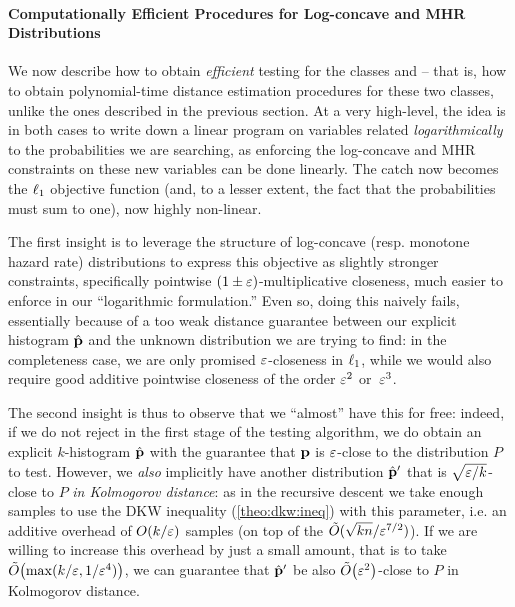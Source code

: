 \paragraph{Computationally Efficient Procedures for Log-concave and MHR Distributions}\label{ssec:efficient:logconcave:mhr}

We now describe how to obtain \emph{efficient} testing for the classes \classlogconcave and \classmhr{} -- that is, how to obtain polynomial-time distance estimation procedures for these two classes, unlike the ones described in the previous section. At a very high-level, the idea is in both cases to write down a linear program on variables related \emph{logarithmically} to the probabilities we are searching, as enforcing the log-concave and MHR constraints on these new variables can be done linearly. The catch now becomes the $\lp[1]$ objective function (and, to a lesser extent, the fact that the probabilities must sum to one), now highly non-linear.

The first insight is to leverage the structure of log-concave (resp. monotone hazard rate) distributions to express this objective as slightly stronger constraints, specifically pointwise $(1\pm\eps)$-multiplicative closeness, much easier to enforce in our ``logarithmic formulation.'' Even so, doing this naively fails, essentially because of a too weak distance guarantee between our explicit histogram $\hat{\D}$ and the unknown distribution we are trying to find: in the completeness case, we are only promised $\eps$-closeness in $\lp[1]$, while we would also require good additive pointwise closeness of the order $\eps^2$ or~$\eps^3$.

The second insight is thus to observe that we ``almost'' have this for free: indeed, if we do not reject in the first stage of the testing algorithm, we do obtain an explicit $k$-histogram $\hat{\D}$ with the guarantee that $\D$ is $\eps$-close to the distribution $P$ to test. However, we \emph{also} implicitly have another distribution $\hat{\D}^\prime$ that is $\sqrt{\eps/k}$-close to $P$ \emph{in Kolmogorov distance}: as in the recursive descent we take enough samples to use the DKW inequality (\cref{theo:dkw:ineq}) with this parameter, i.e. an additive overhead of $\bigO{k/\eps}$ samples (on top of the $\tilde{O}(\sqrt{kn}/\eps^{7/2})$). If we are willing to increase this overhead by just a small amount, that is to take $\tildeO{ \max(k/\eps, 1/\eps^4) }$, we can guarantee that $\hat{\D}^\prime$ be also $\tildeO{\eps^2}$-close to $P$ in Kolmogorov distance.\smallskip

